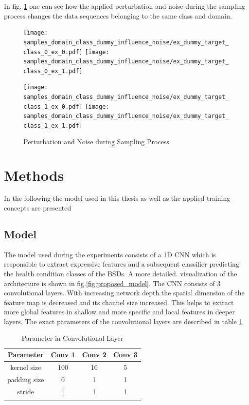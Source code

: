In fig. \ref{fig:samples_domain_class_dummy_influence_noise} one can see how the applied perturbation and noise during the sampling process changes the data sequences belonging to the same class and domain. 


\begin{figure}[H]
  \centering
  \texttt{[image: samples\_domain\_class\_dummy\_influence\_noise/ex\_dummy\_target\_class\_0\_ex\_0.pdf]}
  \hspace{.3cm}
  \texttt{[image: samples\_domain\_class\_dummy\_influence\_noise/ex\_dummy\_target\_class\_0\_ex\_1.pdf]}

  \vspace{.1cm}

  \texttt{[image: samples\_domain\_class\_dummy\_influence\_noise/ex\_dummy\_target\_class\_1\_ex\_0.pdf]}
  \hspace{.3cm}
  \texttt{[image: samples\_domain\_class\_dummy\_influence\_noise/ex\_dummy\_target\_class\_1\_ex\_1.pdf]}

  \caption{Perturbation and Noise during Sampling Process}
  \label{fig:samples_domain_class_dummy_influence_noise}
\end{figure}



\section{Methods}\label{chapter:introduction}
In the following the model used in this thesis as well as the applied training concepts are presented

\subsection{Model}
\label{sec:model}
The model used during the experiments consists of a 1D CNN which is responsible to extract expressive features and a subsequent classifier predicting the health condition classes of the BSDs. A more detailed. visualization of the architecture is shown in fig.\ref{fig:proposed_model}. The CNN consists of 3 convolutional layers. With increasing network depth the spatial dimension of the feature map is decreased and its channel size increased. This helps to extract more global features in shallow and more specific and local features in deeper layers. The exact parameters of the convolutional layers are described in table \ref{tab:parameter_conv} 

\begin{longtable}{c c c c} 
\toprule
Parameter & Conv 1 & Conv 2 & Conv 3 \\
\midrule
kernel size & 100 & 10 & 5 \\

padding size & 0 & 1 & 1 \\

stride & 1 & 1 & 1 \\
\bottomrule
\caption {Parameter in Convolutional Layer}
\label {tab:parameter_conv}
\end{longtable}

